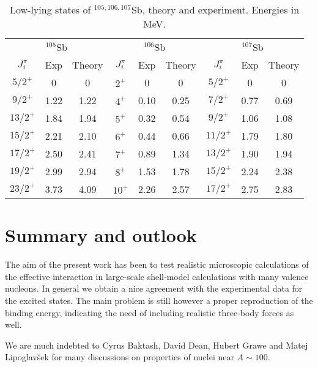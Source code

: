 \begin{table}[hbt]
\begin{center}
\caption{ Low-lying states of $^{105,106,107}$Sb, theory and experiment.
Energies in MeV. \label{tab:tab1}}\footnotesize
\begin{tabular}{ccc|ccc|ccc}
\hline
\multicolumn{3}{c|}{ $^{105}$Sb} & \multicolumn{3}{c|}{ $^{106}$Sb}& \multicolumn{3}{c}{ $^{107}$Sb} \\ 
{$J^{\pi}_i$} & {Exp} & {Theory} & 
{$J^{\pi}_i$} & {Exp} & {Theory} & 
{$J^{\pi}_i$} & {Exp} & {Theory} \\
\hline 
$5/2^{+}$ & 0 & 0 & $2^{+}$ & 0 & 0 & $5/2^{+}$ & 0 & 0 \\
$9/2^{+}$ & 1.22 & 1.22 & $4^{+}$ & 0.10 & 0.25 & $7/2^{+}$ & 0.77 & 0.69 \\
$13/2^{+}$ & 1.84 & 1.94 & $5^{+}$ & 0.32 & 0.54 & $9/2^{+}$ & 1.06 & 1.08  \\
$15/2^{+}$ & 2.21 & 2.10 & $6^{+}$ & 0.44 & 0.66 & $11/2^{+}$ & 1.79 & 1.80 \\
$17/2^{+}$ & 2.50 & 2.41 & $7^{+}$ & 0.89 & 1.34 & $13/2^{+}$ & 1.90 & 1.94  \\
$19/2^{+}$ & 2.99 & 2.94 & $8^{+}$ & 1.53 & 1.78 &  $15/2^{+}$ & 2.24 & 2.38\\
$23/2^{+}$ & 3.73 & 4.09 & $10^{+}$ & 2.26 & 2.57 & $17/2^{+}$ & 2.75 & 2.83  \\\hline
\end{tabular}
\end{center}
\end{table}

\section{Summary and outlook}
The aim of the present work has been to test realistic 
microscopic calculations of the effective interaction 
in large-scale shell-model calculations with many valence nucleons. 
In general we obtain a  nice agreement with the experimental data
for the excited states. The main problem is still however a proper
reproduction of the binding energy, indicating the need of including
realistic three-body forces as well.
 
We are much indebted to Cyrus Baktash, David Dean, Hubert Grawe
and Matej Lipoglav\v{s}ek
for many discussions on properties of nuclei near $A\sim 100$.

